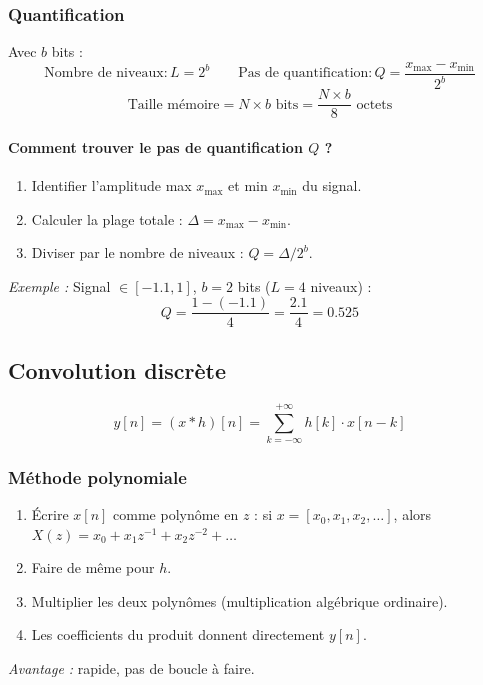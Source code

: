 \documentclass[12pt,a4paper]{article}
\begin{document}
\subsubsection{Quantification}

\begin{tcolorbox}[formbox, title=Formules -- Quantification]
Avec $b$ bits :
\[
  \text{Nombre de niveaux} : L = 2^b
  \qquad
  \text{Pas de quantification} : Q = \frac{x_{\max} - x_{\min}}{2^b}
\]
\[
  \text{Taille mémoire} = N \times b \text{ bits}
  = \frac{N \times b}{8} \text{ octets}
\]
\end{tcolorbox}

\paragraph{Comment trouver le pas de quantification $Q$ ?}
\begin{enumerate}
  \item Identifier l'amplitude max $x_{\max}$ et min $x_{\min}$ du signal.
  \item Calculer la plage totale : $\Delta = x_{\max} - x_{\min}$.
  \item Diviser par le nombre de niveaux : $Q = \Delta / 2^b$.
\end{enumerate}

\textit{Exemple :} Signal $\in [-1.1, 1]$, $b = 2$ bits ($L = 4$ niveaux) :
\[
  Q = \frac{1 - (-1.1)}{4} = \frac{2.1}{4} = 0.525
\]

\subsection{Convolution discrète}

\begin{tcolorbox}[formbox, title=Définition -- Convolution discrète]
\[
  y[n] = (x * h)[n] = \sum_{k=-\infty}^{+\infty} h[k]\cdot x[n-k]
\]
\end{tcolorbox}

\subsubsection{Méthode polynomiale}

\begin{tcolorbox}[methbox, title=Méthode polynomiale (à retenir)]
\begin{enumerate}
  \item Écrire $x[n]$ comme polynôme en $z$ : si $x = [x_0, x_1, x_2, \ldots]$,
        alors $X(z) = x_0 + x_1 z^{-1} + x_2 z^{-2} + \ldots$
  \item Faire de même pour $h$.
  \item Multiplier les deux polynômes (multiplication algébrique ordinaire).
  \item Les coefficients du produit donnent directement $y[n]$.
\end{enumerate}
\textit{Avantage :} rapide, pas de boucle à faire.
\end{tcolorbox}
\end{document}
